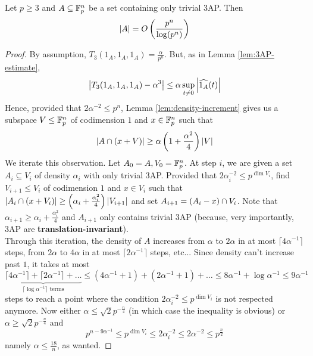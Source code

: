 \documentclass{article}
\begin{document}
\begin{nthm}[Meshulam]\label{thm:meshulam}
  Let $p \ge 3$ and $A \subseteq \mathbb F_p^n$ be a set containing only trivial 3AP. Then
  $$\left\lvert A\right\rvert = O\left(\frac{p^n}{\log(p^n)}\right)$$
\end{nthm}
\begin{proof}
  By assumption, $T_3(1_A, 1_A, 1_A) = \frac\alpha{p^n}$. But, as in Lemma \ref{lem:3AP-estimate},
  $$\left\lvert T_3(1_A, 1_A, 1_A) - \alpha^3\right\rvert \le \alpha \sup_{t \ne 0} \left\lvert \widehat{1_A}(t)\right\rvert$$
  Hence, provided that $2\alpha^{-2} \le p^n$, Lemma \ref{lem:density-increment} gives us a subspace $V \le \mathbb F_p^n$ of codimension $1$ and $x \in \mathbb F_p^n$ such that
  $$\left\lvert A \cap (x + V)\right\rvert \ge \alpha\left(1 + \frac{\alpha^2}4\right)\left\lvert V\right\rvert$$
  We iterate this observation. Let $A_0 = A, V_0 = \mathbb F_p^n$. At step $i$, we are given a set $A_i \subseteq V_i$ of density $\alpha_i$ with only trivial 3AP. Provided that $2\alpha_i^{-2} \le p^{\dim V_i}$, find $V_{i + 1} \le V_i$ of codimension $1$ and $x \in V_i$ such that $\left\lvert A_i \cap (x + V_i)\right\rvert \ge \left(\alpha_i + \frac{\alpha_i^2}4\right)\left\lvert V_{i + 1}\right\rvert$ and set $A_{i + 1} = (A_i - x) \cap V_i$. Note that $\alpha_{i + 1} \ge \alpha_i + \frac{\alpha_i^2}4$ and $A_{i + 1}$ only contains trivial 3AP (because, very importantly, 3AP are {\bf translation-invariant}). \\
  Through this iteration, the density of $A$ increases from $\alpha$ to $2\alpha$ in at most $\lceil 4\alpha^{-1}\rceil$ steps, from $2\alpha$ to $4\alpha$ in at most $\lceil 2\alpha^{-1}\rceil$ steps, etc... Since density can't increase past $1$, it takes at most
  $$\underbrace{\lceil 4\alpha^{-1}\rceil + \lceil 2\alpha^{-1}\rceil + \dots}_{\lceil \log \alpha^{-1}\rceil \text{ terms}} \le (4\alpha^{-1} + 1) + (2\alpha^{-1} + 1) + \dots \le 8\alpha^{-1} + \log \alpha^{-1} \le 9\alpha^{-1}$$
  steps to reach a point where the condition $2\alpha_i^{-2} \le p^{\dim V_i}$ is not respected anymore. Now either $\alpha \le \sqrt 2 p^{-\frac n4}$ (in which case the inequality is obvious) or $\alpha \ge \sqrt 2 p^{-\frac n4}$ and
  $$p^{n - 9\alpha^{-1}} \le p^{\dim V_i} \le 2\alpha_i^{-2} \le 2\alpha^{-2} \le p^{\frac n2}$$
  namely $\alpha \le \frac{18}n$, as wanted.
\end{proof}
\end{document}
